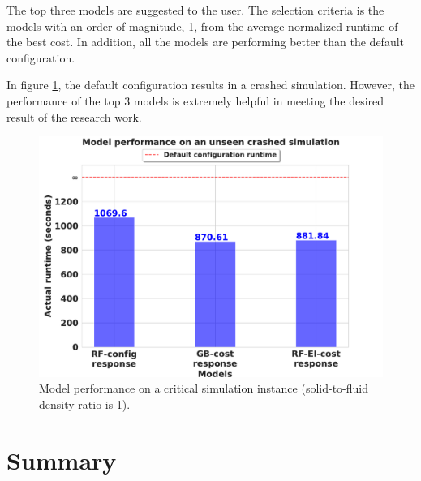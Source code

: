  The top three models are suggested to the user. The selection criteria is the models with an order of magnitude, 1, from the average normalized runtime of the best cost. In addition, all the models are performing better than the default configuration.

In figure \ref{fig:real_eval}, the default configuration results in a crashed simulation. However, the performance of the top 3 models is extremely helpful in meeting the desired result of the research work.

\begin{figure}[!ht]
\centering
\includegraphics[width=\textwidth]{images/real-eval.pdf}
\captionsetup{justification=justified}
\caption[Model performance on a critical unseen simulation instance]{Model performance on a critical simulation instance (solid-to-fluid density ratio is 1).}
\label{fig:real_eval}
\end{figure}



\section{Summary}

